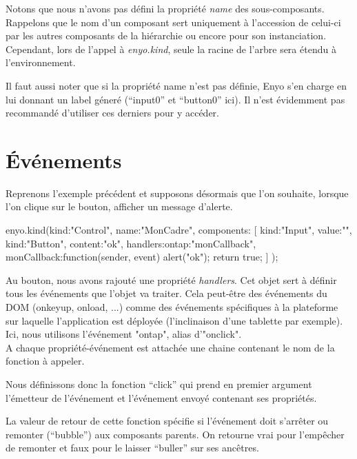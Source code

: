 \documentclass[11pt,a4paper]{report}
\begin{document}
Notons que nous n'avons pas défini la propriété \emph{name} des sous-composants. 
Rappelons que le nom d'un composant sert uniquement à l'accession de celui-ci par les 
autres composants de la hiérarchie ou encore pour son instanciation. Cependant, lors de
l'appel à \emph{enyo.kind}, seule la racine de l'arbre sera étendu à l'environnement.

Il faut aussi noter que si la propriété name n'est pas définie, Enyo s'en charge en lui donnant 
un label géneré (``input0'' et ``button0'' ici). Il n'est évidemment pas recommandé 
d'utiliser ces derniers pour y accéder.

\section{\'Evénements}\label{sec:event}

Reprenons l'exemple précédent et supposons désormais que l'on souhaite, lorsque l'on clique sur le bouton, afficher un message d'alerte.

\begin{JavaScript}
enyo.kind({kind:"Control",
           name:"MonCadre",
           components: [
             {kind:"Input", value:""},
             {kind:"Button", content:"ok",
              handlers:{ontap:"monCallback"},
              monCallback:function(sender, event){
                alert("ok");
                return true;
              }
             }
           ]
       	  });
\end{JavaScript}

Au bouton, nous avons rajouté une propriété \emph{handlers}. 
Cet objet sert à définir tous les événements que l'objet va traiter. 
Cela peut-être des événements du DOM (onkeyup, onload, ...) comme des événements 
spécifiques à la plateforme sur laquelle l'application est déployée 
(l'inclinaison d'une tablette par exemple). Ici, nous utilisons l'événement "ontap", alias d'"onclick".\\

A chaque propriété-événement est attachée une chaine contenant le nom de la fonction à appeler.

Nous définissons donc la fonction ``click'' qui prend en premier argument l'émetteur de 
l'événement et l'événement envoyé contenant ses propriétés.

La valeur de retour de cette fonction spécifie si l'événement doit s'arrêter ou 
remonter (``bubble'') aux composants parents. On retourne vrai pour l'empêcher de 
remonter et faux pour le laisser ``buller'' sur ses ancêtres.
\end{document}
